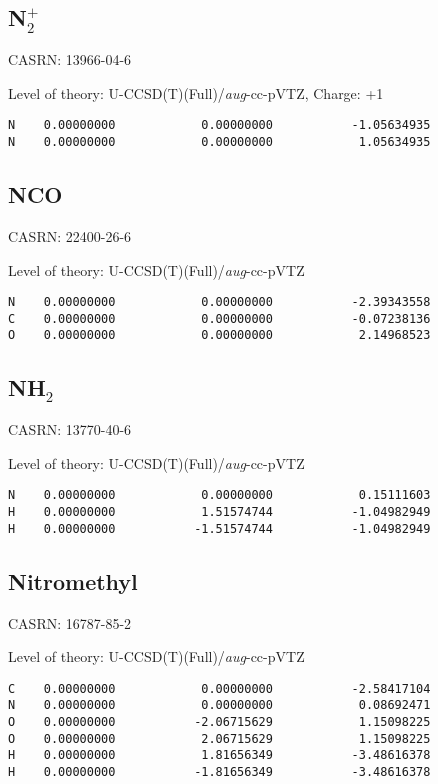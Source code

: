 \documentclass[journal=jctcce,manuscript=article,layout=traditional]{achemso}
\newcommand{\AVTZ}{\emph{aug}-cc-pVTZ}
\begin{document}
\subsection{N$_2^+$}

CASRN: 13966-04-6

\begin{singlespace}
\noindent Level of theory: U-CCSD(T)(Full)/{\AVTZ}, Charge: +1
\begin{verbatim}
N    0.00000000            0.00000000           -1.05634935
N    0.00000000            0.00000000            1.05634935
\end{verbatim}
\end{singlespace}


\subsection{NCO}

CASRN: 22400-26-6

\begin{singlespace}
\noindent Level of theory: U-CCSD(T)(Full)/{\AVTZ}
\begin{verbatim}
N    0.00000000            0.00000000           -2.39343558
C    0.00000000            0.00000000           -0.07238136
O    0.00000000            0.00000000            2.14968523
\end{verbatim}
\end{singlespace}

\subsection{NH$_2$}

CASRN: 13770-40-6

\begin{singlespace}
\noindent Level of theory: U-CCSD(T)(Full)/{\AVTZ}
\begin{verbatim}
N    0.00000000            0.00000000            0.15111603
H    0.00000000            1.51574744           -1.04982949
H    0.00000000           -1.51574744           -1.04982949
\end{verbatim}
\end{singlespace}


\subsection{Nitromethyl}

CASRN: 16787-85-2

\begin{singlespace}
\noindent Level of theory: U-CCSD(T)(Full)/{\AVTZ}
\begin{verbatim}
C    0.00000000            0.00000000           -2.58417104
N    0.00000000            0.00000000            0.08692471
O    0.00000000           -2.06715629            1.15098225
O    0.00000000            2.06715629            1.15098225
H    0.00000000            1.81656349           -3.48616378
H    0.00000000           -1.81656349           -3.48616378
\end{verbatim}
\end{singlespace}
\end{document}
